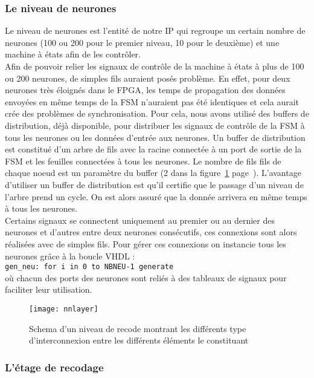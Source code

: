\subsubsection{Le niveau de neurones}
Le niveau de neurones est l'entité de notre IP qui regroupe un certain nombre
de neurones (100 ou 200 pour le premier niveau, 10 pour le deuxième) et une
machine à états afin de les contrôler. \\
Afin de pouvoir relier les signaux de contrôle de la machine à états à plus de
100 ou 200 neurones, de simples fils auraient posés
problème. En effet, pour deux neurones très éloignés dans le FPGA, les temps
de propagation des données envoyées en même temps de la FSM n'auraient pas été
identiques et cela aurait crée des problèmes de synchronisation. Pour cela, nous
avons utilisé des buffers de distribution, déjà disponible, pour distribuer les
signaux de contrôle de la FSM à tous les neurones ou les données d'entrée aux neurones. 
Un buffer de distribution est constitué d'un arbre de fils avec la racine connectée à un port de sortie de la FSM et les feuilles
connectées à tous les neurones. Le nombre de fils fils de chaque noeud est un
paramètre du buffer (2 dans la figure~\ref{fig:nnlayer} page~\pageref{fig:nnlayer}). 
L'avantage d'utiliser un buffer de distribution est qu'il certifie que le passage d'un niveau de l'arbre 
prend un cycle. On est alors assuré que la donnée arrivera en même
temps à tous les neurones. \\
Certains signaux se connectent uniquement au premier ou au dernier des neurones
et d'autres entre deux neurones consécutifs, ces connexions sont alors réalisées avec de simples fils. 
Pour gérer ces connexions on instancie tous les neurones grâce à la boucle VHDL :\\
\texttt{gen\_neu: for i in 0 to NBNEU-1 generate} \\
où chacun des ports des neurones sont reliés à des tableaux de signaux pour
faciliter leur utilisation.

\begin{figure}[h!]
	\texttt{[image: nnlayer]}
	\caption{Schema d'un niveau de recode montrant les différents type 
	d'interconnexion entre les différents éléments le constituant}
	\label{fig:nnlayer}
\end{figure}

\subsubsection{L'étage de recodage}
\label{plan:recode}

